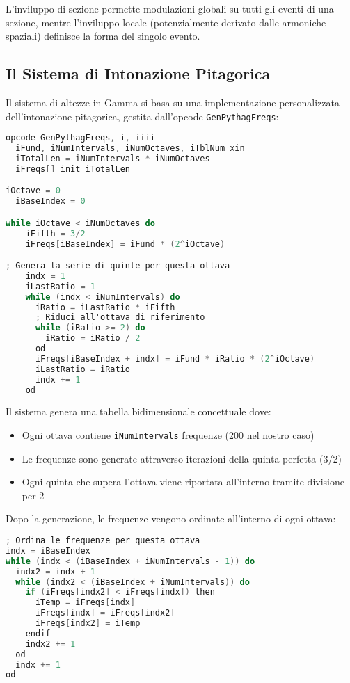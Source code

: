 L'inviluppo di sezione permette modulazioni globali su tutti gli eventi di una sezione, mentre l'inviluppo locale (potenzialmente derivato dalle armoniche spaziali) definisce la forma del singolo evento.
\subsection{Il Sistema di Intonazione Pitagorica}
Il sistema di altezze in Gamma si basa su una implementazione personalizzata dell'intonazione pitagorica, gestita dall'opcode \texttt{GenPythagFreqs}:

\begin{lstlisting}[language=C]
opcode GenPythagFreqs, i, iiii
  iFund, iNumIntervals, iNumOctaves, iTblNum xin
  iTotalLen = iNumIntervals * iNumOctaves
  iFreqs[] init iTotalLen

iOctave = 0
  iBaseIndex = 0

while iOctave < iNumOctaves do
    iFifth = 3/2
    iFreqs[iBaseIndex] = iFund * (2^iOctave)

; Genera la serie di quinte per questa ottava
    indx = 1
    iLastRatio = 1
    while (indx < iNumIntervals) do
      iRatio = iLastRatio * iFifth
      ; Riduci all'ottava di riferimento
      while (iRatio >= 2) do
        iRatio = iRatio / 2
      od
      iFreqs[iBaseIndex + indx] = iFund * iRatio * (2^iOctave)
      iLastRatio = iRatio
      indx += 1
    od
\end{lstlisting}

Il sistema genera una tabella bidimensionale concettuale dove:
\begin{itemize}
    \item Ogni ottava contiene \texttt{iNumIntervals} frequenze (200 nel nostro caso)
    \item Le frequenze sono generate attraverso iterazioni della quinta perfetta (3/2)
    \item Ogni quinta che supera l'ottava viene riportata all'interno tramite divisione per 2
\end{itemize}

Dopo la generazione, le frequenze vengono ordinate all'interno di ogni ottava:

\begin{lstlisting}[language=C]
; Ordina le frequenze per questa ottava
indx = iBaseIndex
while (indx < (iBaseIndex + iNumIntervals - 1)) do
  indx2 = indx + 1
  while (indx2 < (iBaseIndex + iNumIntervals)) do
    if (iFreqs[indx2] < iFreqs[indx]) then
      iTemp = iFreqs[indx]
      iFreqs[indx] = iFreqs[indx2]
      iFreqs[indx2] = iTemp
    endif
    indx2 += 1
  od
  indx += 1
od
\end{lstlisting}

